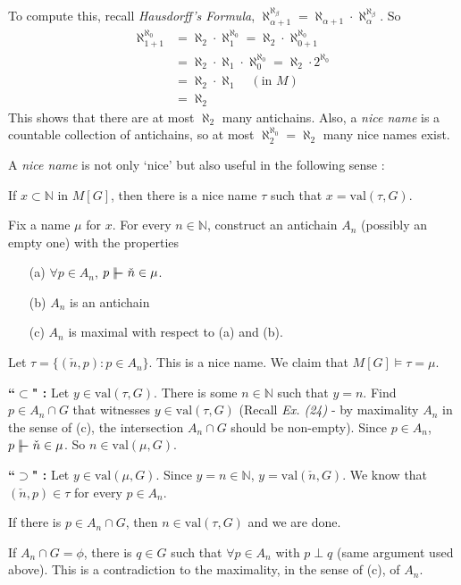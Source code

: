 \documentclass[12pt,a4paper]{article}
\newenvironment{proof}
{\begin{changemargin}{0.5cm}{0.5cm} 
	}%
	{\end{changemargin}
}
\newenvironment{p}
{\begin{proof} 
	}%
	{\end{proof}
}
\begin{document}
\quad To compute this, recall \emph{Hausdorff's Formula}, $\aleph_{\alpha+1}^{\aleph_{\beta}} = \aleph_{\alpha+1} \cdot \aleph_{\alpha}^{\aleph_{\beta}}$. So
\begin{align*}
\aleph_{1+1}^{\aleph_0} &= \aleph_{2} \cdot \aleph_1^{\aleph_0} = \aleph_2 \cdot \aleph_{0+1}^{\aleph_0} \\
&= \aleph_2 \cdot \aleph_1 \cdot \aleph_0^{\aleph_0} = \aleph_2 \cdot 2^{\aleph_0} \\
&= \aleph_2 \cdot \aleph_1 \quad (\text{in } M) \\
&= \aleph_2
\end{align*}
This shows that there are at most $\aleph_2$ many antichains. Also, a \emph{nice name} is a countable collection of antichains, so at most $\aleph_2^{\aleph_0} = \aleph_2$ many nice names exist.
\s

A \emph{nice name} is not only `nice' but also useful in the following sense :
\s

\thm If $x\subset \mathbb{N}$ in $M[G]$, then there is a nice name $\tau$ such that $x= \text{val}(\tau, G)$.
\begin{p}
\pf Fix a name $\mu$ for $x$. For every $n\in \mathbb{N}$, construct an antichain $A_n$ (possibly an empty one) with the properties
\begin{itemize}
\item[(a)] $\forall p\in A_n$, $p\forces \check{n} \in \mu$.
\item[(b)] $A_n$ is an antichain
\item[(c)] $A_n$ is maximal with respect to (a) and (b). 
\end{itemize}
Let $\tau = \{(\check{n}, p) : p\in A_n\}$. This is a nice name. We claim that $M[G] \models \tau =\mu$.

\textbf{``$\subset$" :} Let $y\in  \text{val}(\tau, G)$. There is some $n\in \mathbb{N}$ such that $y=n$. Find $p\in A_n \cap G$ that witnesses $y\in \text{val}(\tau, G)$ (Recall \emph{Ex. (24)} - by maximality $A_n$ in the sense of (c), the intersection $A_n \cap G$ should be non-empty). Since $p\in A_n$, $p\forces \check{n}\in \mu$. So $n\in \text{val}(\mu, G)$.

\textbf{``$\supset$" :} Let $y\in \text{val}(\mu, G)$. Since $y=n\in \mathbb{N}$, $y= \text{val}(\check{n}, G)$. We know that $(\check{n}, p)\in \tau$ for every $p\in A_n$.

\quad If there is $p\in A_n \cap G$, then $n\in \text{val}(\tau, G)$ and we are done.

\quad If $A_n \cap G =\phi$, there is $q\in G$ such that $\forall p\in A_n$ with $p\perp q$ (same argument used above). This is a contradiction to the maximality, in the sense of (c), of $A_n$.

\eop
\end{p}
\s
\end{document}
